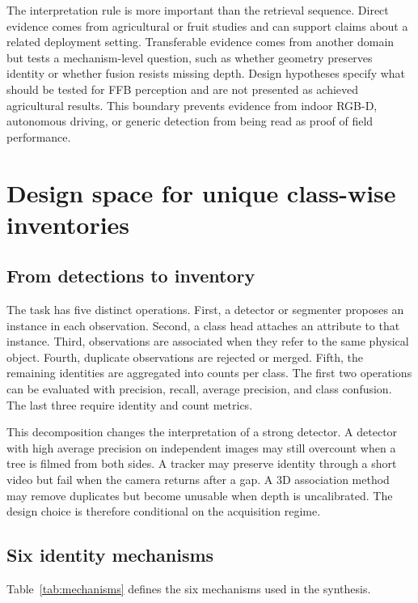 The interpretation rule is more important than the retrieval sequence. Direct evidence comes from agricultural or fruit studies and can support claims about a related deployment setting. Transferable evidence comes from another domain but tests a mechanism-level question, such as whether geometry preserves identity or whether fusion resists missing depth. Design hypotheses specify what should be tested for FFB perception and are not presented as achieved agricultural results. This boundary prevents evidence from indoor RGB-D, autonomous driving, or generic detection from being read as proof of field performance.

\section{Design space for unique class-wise inventories}
\label{sec:designspace}

\subsection{From detections to inventory}

The task has five distinct operations. First, a detector or segmenter proposes an instance in each observation. Second, a class head attaches an attribute to that instance. Third, observations are associated when they refer to the same physical object. Fourth, duplicate observations are rejected or merged. Fifth, the remaining identities are aggregated into counts per class. The first two operations can be evaluated with precision, recall, average precision, and class confusion. The last three require identity and count metrics.

This decomposition changes the interpretation of a strong detector. A detector with high average precision on independent images may still overcount when a tree is filmed from both sides. A tracker may preserve identity through a short video but fail when the camera returns after a gap. A 3D association method may remove duplicates but become unusable when depth is uncalibrated. The design choice is therefore conditional on the acquisition regime.

\subsection{Six identity mechanisms}

Table~\ref{tab:mechanisms} defines the six mechanisms used in the synthesis.

